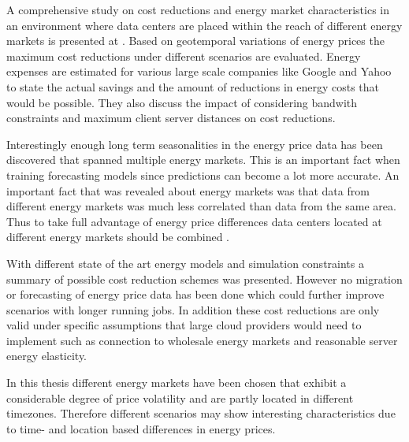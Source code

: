 A comprehensive study on cost reductions and energy market characteristics in an environment where data centers are placed within the reach of different energy markets is presented at \cite{qureshi2009cutting}. Based on geotemporal variations of energy prices the maximum cost reductions under different scenarios are evaluated. Energy expenses are estimated for various large scale companies like Google and Yahoo to state the actual savings and the amount of reductions in energy costs that would be possible. 
They also discuss the impact of considering bandwith constraints and maximum client server distances on cost reductions. 

Interestingly enough long term seasonalities in the energy price data has been discovered that spanned multiple energy markets. This is an important fact when training forecasting models since predictions can become a lot more accurate. An important fact that was revealed about energy markets was that data from different energy markets was much less correlated than data from the same area. Thus to take full advantage of energy price differences data centers located at different energy markets should be combined \cite{qureshi2009cutting}. 

With different state of the art energy models and simulation constraints a summary of possible cost reduction schemes was presented. However no migration or forecasting of energy price data has been done which could further improve scenarios with longer running jobs. In addition these cost reductions are only valid under specific assumptions that large cloud providers would need to implement such as connection to wholesale energy markets and reasonable server energy elasticity. 



In this thesis different energy markets have been chosen that exhibit a considerable degree of price volatility and are partly located in different timezones. Therefore different scenarios may show interesting characteristics due to time- and location based differences in energy prices. 



